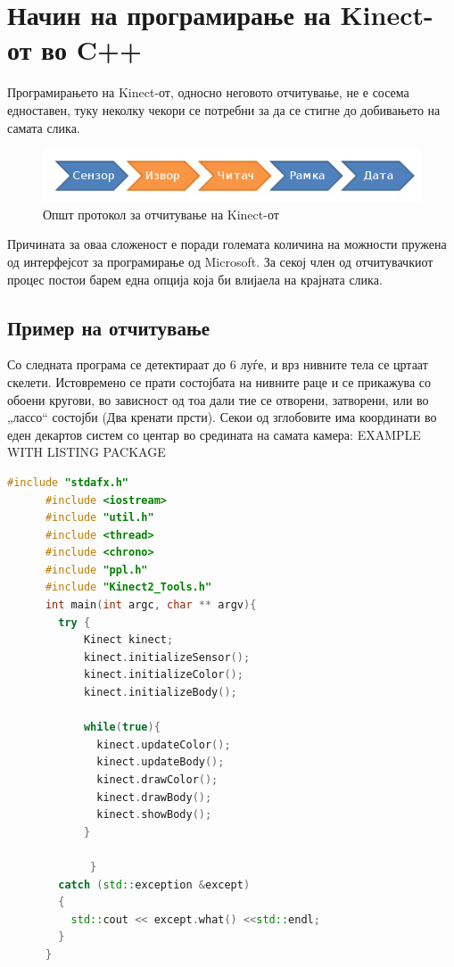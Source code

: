 \documentclass[12pt]{article}
\begin{document}
\newpage

\section{Начин на програмирање на Kinect-от во C++}
  Програмирањето на Kinect-от, односно неговото отчитување, не е сосема едноставен, туку неколку чекори се потребни за да се стигне до добивањето на самата слика.

  \begin{figure}[H]
    \includegraphics[width=0.75\linewidth]{./images/programming_flow_trimmed.png}
    \centering
    \caption{Општ протокол за отчитување на Kinect-от}
    \label{fig:programming_flow_trimmed.png}
    \end{figure}

  Причината за оваа сложеност е поради големата количина на можности пружена од интерфејсот за програмирање од Microsoft. За секој член од отчитувачкиот процес постои барем една опција која би влијаела на крајната слика.

  \subsection{Пример на отчитување}
    Со следната програма се детектираат до 6 луѓе, и врз нивните тела се цртаат скелети. Истовремено се прати состојбата на нивните раце и се прикажува со обоени кругови, во зависност од тоа дали тие се отворени, затворени, или во „лассо“ состојби (Два кренати прсти). Секои од зглобовите има координати во еден декартов систем со центар во средината на самата камера:
    EXAMPLE WITH LISTING PACKAGE
    \begin{lstlisting}[language=C++]
      #include "stdafx.h"
      #include <iostream>
      #include "util.h"
      #include <thread>
      #include <chrono>
      #include "ppl.h"
      #include "Kinect2_Tools.h"
      int main(int argc, char ** argv){
        try {
            Kinect kinect;
            kinect.initializeSensor();
            kinect.initializeColor();
            kinect.initializeBody();

            while(true){
              kinect.updateColor();
              kinect.updateBody();
              kinect.drawColor();
              kinect.drawBody();
              kinect.showBody();
            }

             }
        catch (std::exception &except)
        {
          std::cout << except.what() <<std::endl;
        }
      }
      \end{lstlisting}
\end{document}
